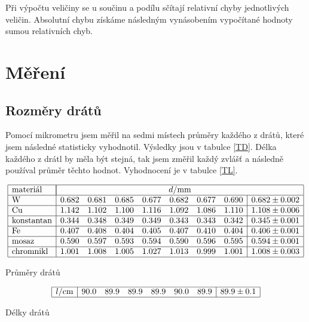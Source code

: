 \documentclass[a4paper,12pt]{article}
\begin{document}
Při výpočtu veličiny se u součinu a podílu sčítají relativní chyby jednotlivých veličin. Absolutní chybu získáme následným vynásobením vypočítané hodnoty sumou relativních chyb.


\section{Měření}
\subsection{Rozměry drátů}
Pomocí mikrometru jsem měřil na sedmi místech průměry každého z drátů, které jsem následné statisticky vyhodnotil. Výsledky jsou v tabulce \ref{TD}. Délka každého 
z drátl by měla být stejná, tak jsem změřil každý zvlášť a následně používal průměr těchto hodnot. Vyhodnocení je v tabulce \ref{TL}.

\begin{table}
$$
\begin{array}{|l|ccccccc|c|}
\hline
\mbox{materiál}&    \multicolumn{8}{|c|}{d/\mbox{mm}} \\ \hline
\mbox{W}&   0.682&  0.681&  0.685&  0.677&  0.682&  0.677&  0.690&  0.682\pm 0.002 \\ \hline
\mbox{Cu}&  1.142&  1.102&  1.100&  1.116&  1.092&  1.086&  1.110&  1.108\pm 0.006 \\ \hline
\mbox{konstantan}&  0.344&  0.348&  0.349&  0.349&  0.343&  0.343&  0.342&  0.345\pm 0.001 \\ \hline
\mbox{Fe}&  0.407&  0.408&  0.404&  0.405&  0.407&  0.410&  0.404&  0.406\pm 0.001 \\ \hline
\mbox{mosaz}&       0.590&  0.597&  0.593&  0.594&  0.590&  0.596&  0.595& 0.594\pm0.001 \\ \hline
\mbox{chromnikl}&   1.001&  1.008&  1.005&  1.027&  1.013&  0.999&  1.001&  1.008\pm 0.003 \\ \hline
\end{array}
$$
\caption{Průměry drátů}
\label{TD}
\end{table}

\begin{table}
$$
\begin{array}{|c|cccccc|c|}
\hline
l/\mbox{cm}&    90.0&   89.9&   89.9&   89.9&   90.0&   89.9&   89.9\pm0.1 \\ \hline
\end{array}
$$
\caption{Délky drátů}
\label{TL}
\end{table}
\end{document}
